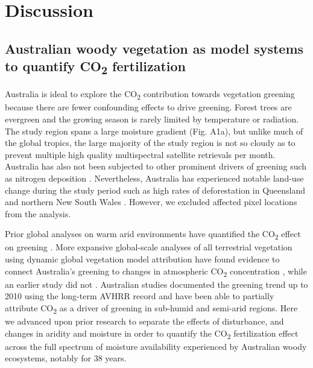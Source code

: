 \documentclass[gc, manuscript]{copernicus}
\begin{document}
\section{Discussion}

\subsection{\texorpdfstring{Australian woody vegetation as model systems
to quantify CO\textsubscript{2}
fertilization}{Australian woody vegetation as model systems to quantify CO2 fertilization}}

Australia is ideal to explore the CO\textsubscript{2} contribution
towards vegetation greening because there are fewer confounding effects
to drive greening. Forest trees are evergreen and the growing season is
rarely limited by temperature or radiation. The study region spans a
large moisture gradient (Fig. A1a), but unlike much of the global
tropics, the large majority of the study region is not so cloudy as to
prevent multiple high quality multispectral satellite retrievals per
month. Australia has also not been subjected to other prominent drivers
of greening such as nitrogen deposition
\citep{ackermanGlobalEstimatesInorganic2019}. Nevertheless, Australia
has experienced notable land-use change during the study period such as
high rates of deforestation in Queensland and northern New South Wales
\citep{evansDeforestationAustraliaDrivers2016}. However, we excluded
affected pixel locations from the analysis.

Prior global analyses on warm arid environments have quantified the
CO\textsubscript{2} effect on greening
\citep{donohueImpactCOFertilization2013b}. More expansive global-scale
analyses of all terrestrial vegetation using dynamic global vegetation
model attribution have found evidence to connect Australia's greening to
changes in atmospheric CO\textsubscript{2} concentration
\citep{winkler_etal21}, while an earlier study did not
\citep{zhuGreeningEarthIts2016a}. Australian studies documented the
greening trend up to 2010 using the long-term AVHRR record
\citep{donohueClimaterelatedTrendsAustralian2009c, ukkolaReducedStreamflowWaterstressed2016b}
and have been able to partially attribute CO\textsubscript{2} as a
driver of greening in sub-humid and semi-arid regions. Here we advanced
upon prior research to separate the effects of disturbance, and changes
in aridity and moisture in order to quantify the CO\textsubscript{2}
fertilization effect across the full spectrum of moisture availability
experienced by Australian woody ecosystems, notably for 38 years.
\end{document}
